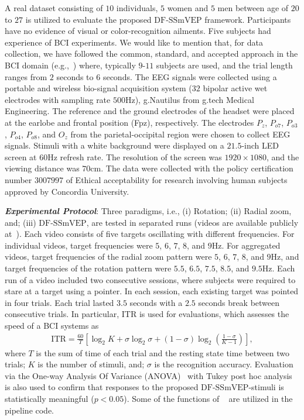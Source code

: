 \documentclass[sensors,accept,moreauthors,pdftex,10pt,a4paper]{mdpi}
\def\DFS{\text{DF-SSmVEP}} %
\theoremstyle{mdpi}
\newcounter{ex}
\newcounter{re}
\theoremstyle{mdpidefinition}
\begin{document}
A real dataset consisting of $10$ individuals, $5$ women and $5$ men between age of $20$ to $27$  is utilized to evaluate the proposed $\DFS$ framework. Participants have no evidence of visual or color-recognition ailments. Five subjects had experience of BCI experiments.
We would like to mention that, for data collection, we have followed the common, standard, and accepted approach in the BCI domain (e.g.,~\cite{yan2017four}) where, typically $9$-$11$ subjects are used, and the trial length ranges from $2$ seconds to $6$ seconds.
 The EEG signals were collected using a portable and wireless bio-signal acquisition system ($32$ bipolar active wet electrodes with sampling rate $500$Hz), g.Nautilus from g.tech Medical Engineering. The reference and the ground electrodes of the headset were placed at the earlobe and frontal position (Fpz), respectively. The electrodes $P_{z}$, $P_{o7}$, $P_{o3}$, $P_{o4}$, $P_{o8}$, and $O_{z}$ from the parietal-occipital region were chosen to collect  EEG signals. Stimuli with a white background were displayed on a $21.5$-inch LED screen at $60$Hz refresh rate. The resolution of the screen was $1920 \times 1080$, and the viewing distance was $70$cm. The data were collected with the policy certification number $3007997$ of Ethical acceptability for research involving human subjects approved by Concordia University.

\vspace{.1in}
\noindent
\textbf{\textit{Experimental Protocol}}:
Three  paradigms, i.e., (i) Rotation; (ii) Radial zoom, and; (iii)  $\DFS$, are tested in separated runs (videos are available publicly at~\cite{RaykaVid}). Each video consists of five targets oscillating with different frequencies. For individual videos, target frequencies were $5$, $6$, $7$, $8$, and $9$Hz. For aggregated videos, target frequencies of the radial zoom pattern were $5$, $6$, $7$, $8$, and $9$Hz, and target frequencies of the rotation pattern were $5.5$, $6.5$, $7.5$, $8.5$, and $9.5$Hz.  Each run of a video included two consecutive sessions, where subjects were required to stare at a target using a pointer.  In each session, each existing target was pointed in four trials. Each trial lasted $3.5$ seconds with a $2.5$ seconds break between consecutive trials. In particular, ITR is used for evaluations, which assesses the speed of a BCI systems as
\begin{eqnarray}
\text{ITR} =\frac{60}{T}\left[\log_2K +\sigma\log_2\sigma +(1-\sigma)\log_2(\frac{1-\sigma}{K-1})\right],
\end{eqnarray}
%
where $T$ is the sum of time of each trial and the resting state time between two trials; $K$ is the number of stimuli, and; $\sigma$ is the recognition accuracy. Evaluation via the One-way Analysis Of Variance (ANOVA)~\cite{xie2012steady} with Tukey post hoc analysis is also used to confirm that responses to the proposed $\DFS$-stimuli is statistically meaningful ($p < 0.05$). Some of the functions of ~\cite{zhang2014frequency} are utilized in the pipeline code.
\end{document}
